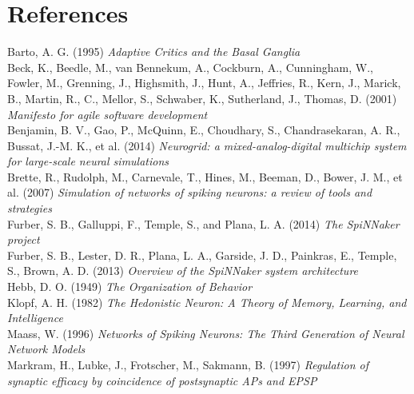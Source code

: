 \documentclass[10pt]{article}
\begin{document}
    \newpage
    
    \section*{References}

    Barto, A. G. (1995) \textit{Adaptive Critics and the Basal Ganglia} \\[-3pt]

    \noindent
    Beck, K., Beedle, M., van Bennekum, A., Cockburn, A., Cunningham, W., Fowler, M., Grenning, J., Highsmith, J., Hunt, A., Jeffries, R., Kern, J., Marick, B., Martin, R., C., Mellor, S., Schwaber, K., Sutherland, J., Thomas, D. (2001) \textit{Manifesto for agile software development} \\[-3pt]

    \noindent
    Benjamin, B. V., Gao, P., McQuinn, E., Choudhary, S., Chandrasekaran, A. R., Bussat, J.-M. K., et al. (2014) \textit{ Neurogrid: a mixed-analog-digital multichip system for large-scale neural simulations} \\[-3pt]

    \noindent 
    Brette, R., Rudolph, M., Carnevale, T., Hines, M., Beeman, D., Bower, J. M., et al. (2007) \textit{ Simulation of networks of spiking neurons: a review of tools and strategies} \\[-3pt]

    \noindent    
    Furber, S. B., Galluppi, F., Temple, S., and Plana, L. A. (2014) \textit{The SpiNNaker project} \\[-3pt]
    
    \noindent    
    Furber, S. B., Lester, D. R., Plana, L. A., Garside, J. D., Painkras, E., Temple, S., Brown, A. D. (2013) \textit{Overview of the SpiNNaker system architecture} \\[-3pt]

    \noindent
    Hebb, D. O. (1949) \textit{The Organization of Behavior} \\[-3pt]

    \noindent    
    Klopf, A. H. (1982) \textit{The Hedonistic Neuron: A Theory of Memory, Learning, and Intelligence} \\[-3pt]

    \noindent
    Maass, W. (1996) \textit{Networks of Spiking Neurons: The Third Generation of Neural Network Models} \\[-3pt]

    \noindent
    Markram, H., Lubke, J., Frotscher, M., Sakmann, B. (1997) \textit{Regulation of synaptic efficacy by coincidence of postsynaptic APs and EPSP } \\[-3pt]
\end{document}
